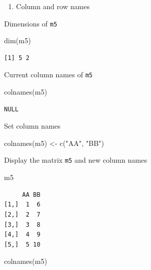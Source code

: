 \documentclass[
  letterpaper,
  DIV=11,
  numbers=noendperiod]{scrreprt}
\newenvironment{Shaded}{\begin{snugshade}}{\end{snugshade}}
\newcommand{\FunctionTok}[1]{\textcolor[rgb]{0.28,0.35,0.67}{#1}}
\newcommand{\NormalTok}[1]{\textcolor[rgb]{0.00,0.23,0.31}{#1}}
\newcommand{\OtherTok}[1]{\textcolor[rgb]{0.00,0.23,0.31}{#1}}
\newcommand{\StringTok}[1]{\textcolor[rgb]{0.13,0.47,0.30}{#1}}
\providecommand{\tightlist}{%
  \setlength{\itemsep}{0pt}\setlength{\parskip}{0pt}}\usepackage{longtable,booktabs,array}
\begin{document}
\begin{enumerate}
\def\labelenumi{\alph{enumi}.}
\setcounter{enumi}{5}
\tightlist
\item
  Column and row names
\end{enumerate}

Dimensions of \texttt{m5}

\begin{Shaded}
\begin{Highlighting}[]
\FunctionTok{dim}\NormalTok{(m5)}
\end{Highlighting}
\end{Shaded}

\begin{verbatim}
[1] 5 2
\end{verbatim}

Current column names of \texttt{m5}

\begin{Shaded}
\begin{Highlighting}[]
\FunctionTok{colnames}\NormalTok{(m5)}
\end{Highlighting}
\end{Shaded}

\begin{verbatim}
NULL
\end{verbatim}

Set column names

\begin{Shaded}
\begin{Highlighting}[]
\FunctionTok{colnames}\NormalTok{(m5) }\OtherTok{\textless{}{-}} \FunctionTok{c}\NormalTok{(}\StringTok{"AA"}\NormalTok{, }\StringTok{"BB"}\NormalTok{)}
\end{Highlighting}
\end{Shaded}

Display the matrix \texttt{m5} and new column names

\begin{Shaded}
\begin{Highlighting}[]
\NormalTok{m5}
\end{Highlighting}
\end{Shaded}

\begin{verbatim}
     AA BB
[1,]  1  6
[2,]  2  7
[3,]  3  8
[4,]  4  9
[5,]  5 10
\end{verbatim}

\begin{Shaded}
\begin{Highlighting}[]
\FunctionTok{colnames}\NormalTok{(m5)}
\end{Highlighting}
\end{Shaded}
\end{document}
